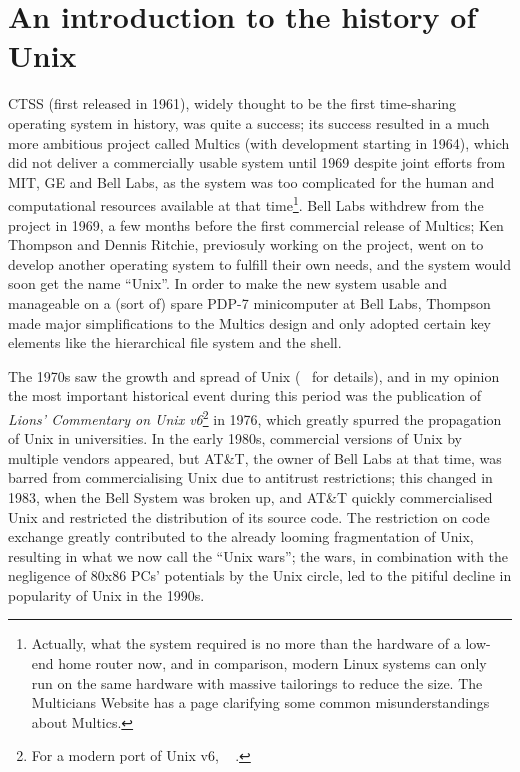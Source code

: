 \newpart
\section{An introduction to the history of Unix}\label{sec:intro}

CTSS (first released in 1961), widely thought to be the
first time-sharing operating system in history, was quite a success; its success
resulted in a much more ambitious project called Multics
(with development starting in 1964), which did not deliver a commercially usable
system until 1969 despite joint efforts from
MIT, GE and Bell Labs, as the system was too complicated for the human and
computational resources available at that time\footnote{Actually, what the
system required is no more than the hardware of a low-end home router now,
and in comparison, modern Linux systems can only run on the same hardware
with massive tailorings to reduce the size.  The Multicians Website has a
page clarifying some common misunderstandings about
Multics.}.  Bell Labs withdrew from the project in 1969, a few months before
the first commercial release of Multics; Ken Thompson and Dennis Ritchie,
previosuly working on the project, went on to develop another operating
system to fulfill their own needs, and the system would soon get the name
``Unix''.  In order to make the new system usable
and manageable on a (sort of) spare PDP-7 minicomputer at Bell Labs, Thompson
made major simplifications to the Multics design and only adopted certain key
elements like the hierarchical file system and the shell.

The 1970s saw the growth and spread of Unix (\cf~\parencite{wiki:unixhist}
for details), and in my opinion the most important historical event
during this period was the publication of \emph{Lions' Commentary on Unix
v6}\footnote{For a modern port of Unix v6, \cf~%
\parencite{wiki:xv6}.} in 1976, which greatly spurred the propagation of Unix
in universities.  In the early 1980s, commercial versions of Unix by multiple
vendors appeared, but AT\&T, the owner of Bell Labs at that time, was barred
from commercialising Unix due to antitrust restrictions; this changed in
1983, when the Bell System was broken up, and AT\&T quickly commercialised
Unix and restricted the distribution of its source code.  The restriction on
code exchange greatly contributed to the already looming fragmentation of Unix,
resulting in what we now call the ``Unix wars''; the
wars, in combination with the negligence of 80x86 PCs' potentials by the Unix
circle, led to the pitiful decline in popularity of Unix in the 1990s.

